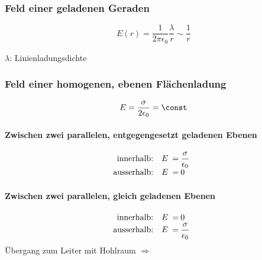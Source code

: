 		\subsubsection{Feld einer geladenen Geraden} %
			\begin{equation*}
				E(r) = \frac{1}{2\pi\epsilon_0} \frac{\lambda}{r} \sim \frac{1}{r}
			\end{equation*}
			\begin{tightitemize}
				\item[$\lambda$:] Linienladungsdichte \niceunit{\coulomb\per\metre}
			\end{tightitemize}
		\subsubsection{Feld einer homogenen, ebenen Flächenladung} %
			\begin{equation*}
				E = \frac{\sigma}{2\epsilon_0} = \const
			\end{equation*}
			\paragraph{Zwischen zwei parallelen, entgegengesetzt geladenen Ebenen} %
				\begin{gather*}
					\begin{array}{@{}r@{\quad E\:=\:}l}
						\text{innerhalb:} & \displaystyle\frac{\sigma}{\epsilon_0} \\
						\text{ausserhalb:} & 0
					\end{array}
				\end{gather*}
			\paragraph{Zwischen zwei parallelen, gleich geladenen Ebenen} %
				\begin{gather*}
					\begin{array}{@{}r@{\quad E\:=\:}l}
						\text{innerhalb:} & 0 \\
						\text{ausserhalb:} & \displaystyle\frac{\sigma}{\epsilon_0}
					\end{array}
				\end{gather*}
				Übergang zum Leiter mit Hohlraum $\Rightarrow$
